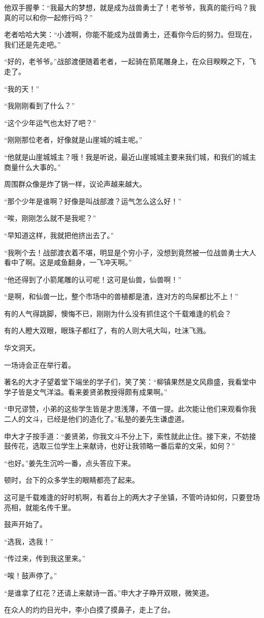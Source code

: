 \begin{this_body}
他双手握拳：“我最大的梦想，就是成为战兽勇士了！老爷爷，我真的能行吗？我真的可以和你一起修行吗？”

老者哈哈大笑：“小渡啊，你能不能成为战兽勇士，还看你今后的努力。但现在，我们还是先走吧。”

“好的，老爷爷。”战部渡便随着老者，一起骑在箭尾雕身上，在众目睽睽之下，飞走了。

“我的天！”

“我刚刚看到了什么？”

“这个少年运气也太好了吧？”

“刚刚那位老者，好像就是山崖城的城主呢。”

“他就是山崖城城主？哦！我是听说，最近山崖城城主要来我们城，和我们的城主商量什么大事的。”

周围群众像是炸了锅一样，议论声越来越大。

“那个少年是谁啊？好像是叫战部渡？运气怎么这么好！”

“唉，刚刚怎么就不是我呢？”

“早知道这样，我就把他挤出去了。”

“我咧个去！战部渡衣着不堪，明显是个穷小子，没想到竟然被一位战兽勇士大人看中了啊。这是咸鱼翻身，一飞冲天啊。”

“他还得到了小箭尾雕的认可呢！这可是仙兽，仙兽啊！”

“是啊，和仙兽一比，整个市场中的兽植都是渣，连对方的鸟屎都比不上！”

有的人气得跳脚，懊悔不已，刚刚为什么没有抓住这个千载难逢的机会？

有的人瞪大双眼，眼珠子都红了，有的人则大吼大叫，吐沫飞溅。

华文洞天。

一场诗会正在举行着。

著名的大才子望着堂下端坐的学子们，笑了笑：“柳镇果然是文风鼎盛，我看堂中学子皆是文气洋溢。看来姜贤弟教授得颇有成果啊。”

“申兄谬赞，小弟的这些学生皆是才思浅薄，不值一提。此次能让他们来观看你我二人的文斗，已经是他们的造化了。”私塾的姜先生谦虚道。

申大才子按手道：“姜贤弟，你我文斗不分上下，索性就此止住。接下来，不妨接鼓传花，选取三位学生上来献诗，也好让我领略一番后辈的文采，如何？”

“也好。”姜先生沉吟一番，点头答应下来。

顿时，台下的众多学生的眼睛都亮了起来。

这可是千载难逢的好时机啊，有着台上的两大才子坐镇，不管吟诗如何，只要登场亮相，就能名传千里。

鼓声开始了。

“选我，选我！”

“传过来，传到我这里来。”

“唉！鼓声停了。”

“是谁拿了红花？还请上来献诗一首。”申大才子睁开双眼，微笑道。

在众人的灼灼目光中，李小白摸了摸鼻子，走上了台。

\end{this_body}

